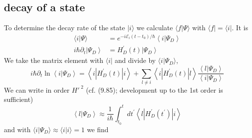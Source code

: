 \subsection{decay of a state}
To determine the decay rate of the state $| i\rangle$ we calculate $\langle f | \Psi\rangle$ with $\langle f | = \langle i |$. It is
\begin{equation}
\begin{aligned}\langle i | \Psi\rangle &= e^{-i \mathcal{E}_{i}\left(t-t_{0}\right) / \hbar}\left\langle i | \Psi_{D}\right\rangle \\ i \hbar \partial_{t}\left|\Psi_{D}\right\rangle &= H_{D}^{\prime}(t)\left|\Psi_{D}\right\rangle \end{aligned}
\end{equation}
We take the matrix element with $\langle i |$ and divide by $\langle i | \Psi_D\rangle$,
\begin{equation}
    i \hbar \partial_{t} \ln \left\langle i | \Psi_{D}\right\rangle=\left\langle i\left|H_{D}^{\prime}(t)\right| i\right\rangle+\sum_{l \neq i}\left\langle i\left|H_{D}^{\prime}(t)\right| l\right\rangle \frac{\left\langle l | \Psi_{D}\right\rangle}{\left\langle i | \Psi_{D}\right\rangle}
    \end{equation}
We can write in order $H'^{\;2}$ (cf. (9.85); development up to the 1st order is sufficient)
\begin{equation}
    \left\langle l | \Psi_{D}\right\rangle \approx \frac{1}{i \hbar} \int_{t_{0}}^{t} d t^{\prime}\left\langle l\left|H_{D}^{\prime}\left(t^{\prime}\right)\right| i\right\rangle
    \end{equation}
and with $\langle i | \Psi_D\rangle\approx \langle i | i\rangle = 1$ we find


